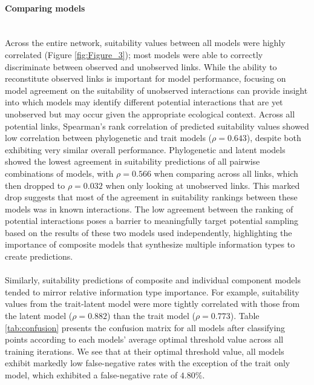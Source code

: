 \paragraph{Comparing models}\mbox{}\\ 
Across the entire network, suitability values between all models were highly correlated (Figure \ref{fig:Figure_3}); most models were able to correctly discriminate between observed and unobserved links. While the ability to reconstitute observed links is important for model performance, focusing on model agreement on the suitability of unobserved interactions can provide insight into which models may identify different potential interactions that are yet unobserved but may occur given the appropriate ecological context. Across all potential links, Spearman's rank correlation of predicted suitability values showed low correlation between phylogenetic and trait models ($\rho = 0.643$), despite both exhibiting very similar overall performance. Phylogenetic and latent models showed the lowest agreement in suitability predictions of all pairwise combinations of models, with $\rho = 0.566$ when comparing across all links,  which then dropped to $\rho = 0.032$ when only looking at unobserved links. This marked drop suggests that most of the agreement in suitability rankings between these models was in known interactions. The low agreement between the ranking of potential interactions poses a barrier to meaningfully target potential sampling based on the results of these two models used independently, highlighting the importance of composite models that synthesize multiple information types to create predictions. 


\paragraph*{}
Similarly, suitability predictions of composite and individual component models tended to mirror relative information type importance. For example, suitability values from the trait-latent model were more tightly correlated with those from the latent model ($\rho=0.882$) than the trait model ($\rho=0.773$). Table \ref{tab:confusion} presents the confusion matrix for all models after classifying points according to each models' average optimal threshold value across all training iterations. We see that at their optimal threshold value, all models exhibit markedly low false-negative rates with the exception of the trait only model, which exhibited a false-negative rate of $4.80\%$.







